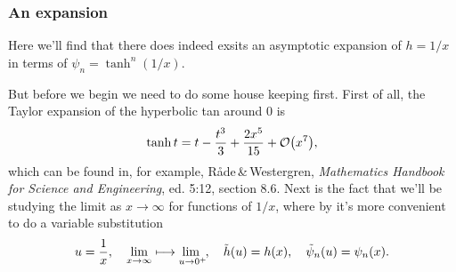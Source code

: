 \documentclass[11pt,letter, swedish, english
]{article}
\begin{document}
\subsubsection{An expansion}
\newcommand{\limu}{\ensuremath\lim_{u\to0^+\hspace{-3pt}}\hspace{+2pt}}

Here we'll find that there does indeed exsits an asymptotic expansion
of $h=1/x$ in terms of $\psi_n=\tanh^n(1/x)$. 

But before we begin we need to do some house keeping first. First of
all, the Taylor expansion of the hyperbolic tan around $0$ is
\begin{equation} \label{eq:tanh}
\tanh{t} = t - \frac{t^3}{3} + \frac{2x^5}{15} + \order{x^7},
\end{equation}
which can be found in, for example, Råde\,\&\,Westergren,
\textit{Mathematics Handbook for Science and Engineering}, ed. 5:12,
section 8.6.
Next is the fact that we'll be studying the limit as $x\to\infty$ for
functions of $1/x$, where by it's more convenient to do a variable
substitution
\begin{equation}
u=\frac{1}{x} \qcomma \lim_{x\to\infty} \longmapsto \limu\qcomma
\tilde{h}(u)=h(x)\qcomma\tilde\psi_n(u)=\psi_n(x).
\end{equation}
\end{document}
